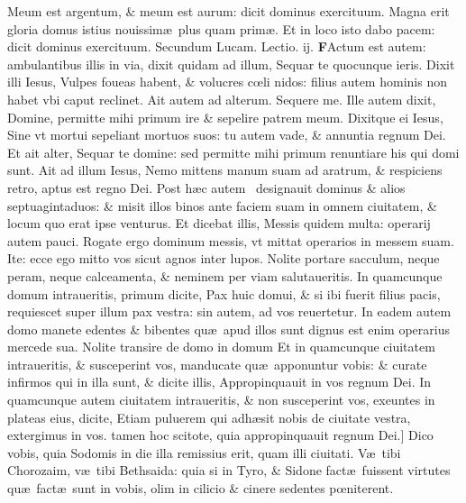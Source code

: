 \documentclass[a5paper,10pt]{book}
\def\leftmarginnote{%
	\lrmarginnote{\hskip -\marginparsep \hskip -6.5em}}
\def\rightmarginnote{%
	\lrmarginnote{\hskip\columnwidth \hskip -1em}}
\def\ae{æ}
\def\oe{œ}
\begin{document}
\begin{multicols*}{2}
Meum est argentum, \& meum est aurum: dicit dominus exercituum. Magna erit gloria domus istius nouissim\ae \ plus quam prim\ae . Et in loco isto dabo pacem: dicit dominus exercituum.
\newline \color{red} Secundum Lucam. \hfill Lectio. ij. \color{black}
\vspace{-.25em}
\lettrine[lines=2]{\bfseries \color{red} F}{}Actum\leftmarginnote{\begin{flushright}ca 9.\end{flushright}} est autem: ambulantibus illis in via, dixit quidam ad illum, Sequar te quocunque ieris.
Dixit illi Iesus, Vulpes foueas habent, \& volucres c\oe li nidos: filius autem hominis non habet vbi caput reclinet.
Ait autem ad alterum. Sequere me. Ille autem dixit, Domine, permitte mihi primum ire \& sepelire patrem meum.
Dixitque ei Iesus, Sine vt mortui sepeliant mortuos suos: tu autem vade, \& annuntia regnum Dei.
Et ait alter, Sequar te domine: sed permitte mihi primum renuntiare his qui domi sunt.
Ait ad illum Iesus, Nemo mittens manum suam ad aratrum, \& respiciens retro, aptus est regno Dei.
Post\leftmarginnote{\begin{flushright}c.10.a\end{flushright}} h\ae c autem \textdagger \ designauit dominus \& alios septuagintaduos: \& misit illos binos ante faciem suam in omnem ciuitatem, \& locum quo erat ipse venturus.
Et dicebat illis, Messis quidem multa: operarij
autem pauci.
Rogate ergo dominum messis, vt mittat operarios in messem suam.
Ite: ecce ego mitto vos sicut agnos inter lupos. Nolite portare sacculum, neque peram, neque calceamenta, \& neminem per viam salutaueritis.
In quamcunque domum intraueritis, primum dicite, Pax huic domui, \& si ibi fuerit filius pacis, requiescet super illum pax vestra: sin autem, ad vos reuertetur.
In eadem autem domo manete edentes \& bibentes qu\ae \ apud illos sunt dignus est enim operarius mercede sua.
Nolite transire de domo in domum Et in quamcunque ciuitatem intraueritis, \& susceperint vos, manducate qu\ae \ apponuntur vobis: \& curate infirmos qui in illa sunt, \& dicite illis, Appropinquauit in vos regnum Dei.
In quamcunque autem ciuitatem intraueritis, \& non susceperint vos, exeuntes in plateas eius, dicite, Etiam puluerem qui adh\ae sit nobis de ciuitate vestra, extergimus in vos. tamen hoc scitote, quia appropinquauit regnum Dei.]
Dico\rightmarginnote{B} vobis, quia Sodomis in die illa remissius erit, quam illi ciuitati.
V\ae \ tibi Chorozaim, v\ae \ tibi Bethsaida: quia si in Tyro, \& Sidone fact\ae \ fuissent virtutes qu\ae \ fact\ae \ sunt in vobis, olim in cilicio \& cinere sedentes p\oe niterent.

\end{multicols*}
\end{document}
